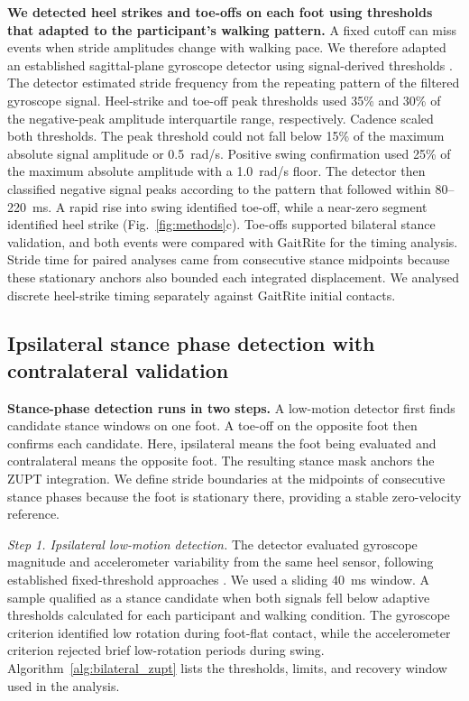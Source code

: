 \documentclass[fleqn,10pt,lineno]{wlpeerj}
\begin{document}
\textbf{We detected heel strikes and toe-offs on each foot using thresholds that adapted to the participant's walking pattern.} A fixed cutoff can miss events when stride amplitudes change with walking pace. We therefore adapted an established sagittal-plane gyroscope detector \citep{Salarian2004} using signal-derived thresholds \citep{Greene2010}. The detector estimated stride frequency from the repeating pattern of the filtered gyroscope signal. Heel-strike and toe-off peak thresholds used 35\% and 30\% of the negative-peak amplitude interquartile range, respectively. Cadence scaled both thresholds. The peak threshold could not fall below 15\% of the maximum absolute signal amplitude or 0.5~rad/s. Positive swing confirmation used 25\% of the maximum absolute amplitude with a 1.0~rad/s floor. The detector then classified negative signal peaks according to the pattern that followed within 80--220~ms. A rapid rise into swing identified toe-off, while a near-zero segment identified heel strike (Fig.~\ref{fig:methods}c). Toe-offs supported bilateral stance validation, and both events were compared with GaitRite for the timing analysis. Stride time for paired analyses came from consecutive stance midpoints because these stationary anchors also bounded each integrated displacement. We analysed discrete heel-strike timing separately against GaitRite initial contacts.

\subsection{Ipsilateral stance phase detection with contralateral validation}\label{sec:stance}

\textbf{Stance-phase detection runs in two steps.} A low-motion detector first finds candidate stance windows on one foot. A toe-off on the opposite foot then confirms each candidate. Here, ipsilateral means the foot being evaluated and contralateral means the opposite foot. The resulting stance mask anchors the ZUPT integration. We define stride boundaries at the midpoints of consecutive stance phases because the foot is stationary there, providing a stable zero-velocity reference.

\textit{Step 1. Ipsilateral low-motion detection.} The detector evaluated gyroscope magnitude and accelerometer variability from the same heel sensor, following established fixed-threshold approaches \citep{Skog2010, Foxlin2005}. We used a sliding 40~ms window. A sample qualified as a stance candidate when both signals fell below adaptive thresholds calculated for each participant and walking condition. The gyroscope criterion identified low rotation during foot-flat contact, while the accelerometer criterion rejected brief low-rotation periods during swing. Algorithm~\ref{alg:bilateral_zupt} lists the thresholds, limits, and recovery window used in the analysis.
\end{document}
